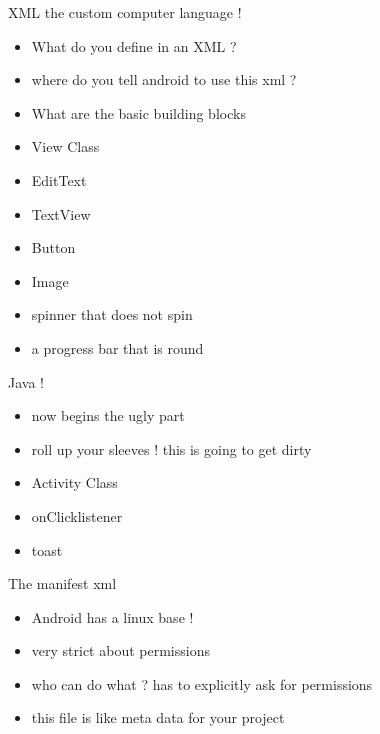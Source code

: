 \documentclass[11pt]{beamer}
\begin{document}
\begin{frame}[containsverbatim]{XML the custom computer language !}
	\begin{flushleft}
	\begin{itemize}
		\item What do you define in an XML ?
		\item where do you tell android to use this xml ?
		\item What are the basic building blocks
		\item View Class
		\item EditText
		\item TextView
		\item Button
		\item Image 
		\item spinner that does not spin 
		\item a progress bar that is round
	\end{itemize}
	\end{flushleft}
\end{frame}


\begin{frame}[containsverbatim]{Java !}
	\begin{flushleft}
	\begin{itemize}
		\item now begins the ugly part 
		\item roll up your sleeves ! this is going to get dirty
		\item Activity Class
		\item onClicklistener
		\item toast 
	\end{itemize}
	\end{flushleft}
\end{frame}


\begin{frame}[containsverbatim]{The manifest xml}
	\begin{flushleft}
	\begin{itemize}
		\item Android has a linux base !
		\item very strict about permissions
		\item who can do what ? has to explicitly ask for permissions
		\item this file is like meta data for your project

	\end{itemize}
	\end{flushleft}
\end{frame}
\end{document}
